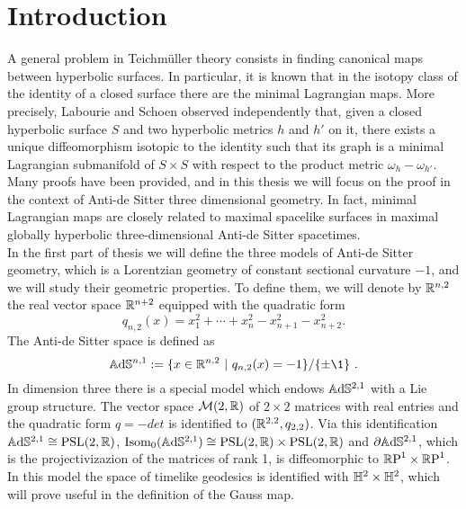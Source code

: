 \chapter*{Introduction}
\noindent A general problem in Teichm\"uller theory consists in finding canonical maps between hyperbolic surfaces. In particular, it is known that in the isotopy class of the identity of a closed surface there are the minimal Lagrangian maps. More precisely, Labourie and Schoen observed independently that, given a closed hyperbolic surface $S$ and two hyperbolic metrics $h$ and $ h'$ on it, there exists a unique diffeomorphism isotopic to the identity such that its graph is a minimal Lagrangian submanifold of $S \times S$ with respect to the product metric $\omega_h - \omega_{h'}$.
Many proofs have been provided, and in this thesis we will focus on the proof in the context of Anti-de Sitter three dimensional geometry. In fact, minimal Lagrangian maps are closely related to maximal spacelike surfaces in maximal globally hyperbolic three-dimensional Anti-de Sitter spacetimes. \\

In the first part of thesis we will define the three models of Anti-de Sitter geometry, which is a Lorentzian geometry of constant sectional curvature $-1$, and we will study their geometric properties. To define them, we will denote by $\mathbb{R} ^{n,2}$ the real vector space $\mathbb{R} ^{n+2}$ equipped with the quadratic form
\[
q_{n,2}(x) = x_1^2 + \cdots + x_n^2 - x_{n+1}^2 - x_{n+2}^2.
\]
The Anti-de Sitter space is defined as
\[
\A^{n,1} := \{ x\in \R^{n,2} \ | \ q_{n,2}(x) = -1 \} / \{ \pm \1 \} \ .
\]
In dimension three there is a special model which endows $\mathbb{A}\mathrm{d}\mathbb{S}^{2,1}$ with a Lie group structure.
The vector space $\mathcal{M}(2,\mathbb{R})$ of $2 \times 2$ matrices with real entries and the quadratic form $q= -det$ is identified to $(\mathbb{R}^{2,2},q_{2,2})$. Via this identification $\mathbb{A}\mathrm{d}\mathbb{S}^{2,1} \cong \text{PSL}(2,\mathbb{R})$, $\text{Isom}_0(\mathbb{A}\mathrm{d}\mathbb{S}^{2,1}) \cong \text{PSL}(2,\mathbb{R}) \times \text{PSL}(2,\mathbb{R})$ and $\partial\mathbb{A}\mathrm{d}\mathbb{S}^{2,1}$, which is the projectivizazion of the matrices of rank 1, is diffeomorphic to $\mathbb{R}\textup{P}^1\times\mathbb{R}\textup{P}^1$. In this model the space of timelike geodesics is identified with $\mathbb{H}^2 \times \mathbb{H}^2$, which will prove useful in the definition of the Gauss map.\\

